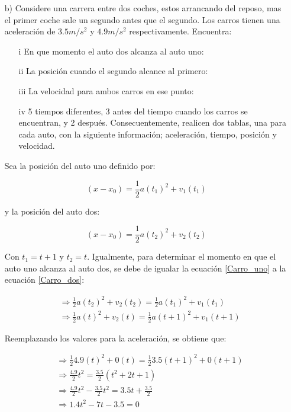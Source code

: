 \documentclass[letterpaper, 12pt]{article}
\begin{document}
\begin{itemize}
    \item [b)] Considere una carrera entre dos coches, estos arrancando del reposo, mas el primer coche sale un segundo antes que el segundo. Los carros tienen una aceleraci\'on de $3.5 m\slash s^2$ y $4.9 m\slash s^2$ respectivamente. Encuentra:

    \begin{itemize}
        \item [i] En que momento el auto dos alcanza al auto uno:
        \item [ii] La posici\'on cuando el segundo alcance al primero:
        \item [iii] La velocidad para ambos carros en ese punto:
        \item [iv] 5 tiempos diferentes, 3 antes del tiempo cuando los carros se encuentran, y 2 despu\'es. Consecuentemente, realicen dos tablas, una para cada auto, con la siguiente informaci\'on; aceleraci\'on, tiempo, posici\'on y velocidad. \\
\end{itemize}

    Sea la posici\'on del auto uno definido por:

    \begin{equation}
    \label{Carro_uno}
        (x-x_0) = \frac{1}{2}a(t_1)^2 + v_1(t_1)
    \end{equation}

    y la posici\'on del auto dos:
      
    \begin{equation}
    \label{Carro_dos}
        (x-x_0) = \frac{1}{2}a(t_2)^2 + v_2(t_2)
    \end{equation}
    
Con $t_1 = t+1$ y $t_2 = t$. Igualmente, para determinar el momento en que el auto uno alcanza al auto dos, se debe de igualar la ecuaci\'on \ref{Carro_uno} a la ecuaci\'on \ref{Carro_dos}:

\begin{align*}
    &\Rightarrow \frac{1}{2}a(t_2)^2 + v_2(t_2) = \frac{1}{2}a(t_1)^2 + v_1(t_1) \\
    &\Rightarrow  \frac{1}{2}a(t)^2 + v_2(t) = \frac{1}{2}a(t+1)^2 + v_1(t+1)
\end{align*}

Reemplazando los valores para la aceleraci\'on, se obtiene que:

\begin{align*}
    &\Rightarrow  \frac{1}{2} 4.9(t)^2 + 0(t) = \frac{1}{2} 3.5(t+1)^2 + 0(t+1) \\
    &\Rightarrow \frac{4.9}{2}t^2 = \frac{3.5}{2}(t^2 + 2t + 1) \\
    &\Rightarrow \frac{4.9}{2}t^2 - \frac{3.5}{2}t^2 = 3.5t + \frac{3.5}{2} \\
    &\Rightarrow 1.4t^2 - 7t - 3.5 = 0 
\end{align*}


\end{itemize}
\end{document}
